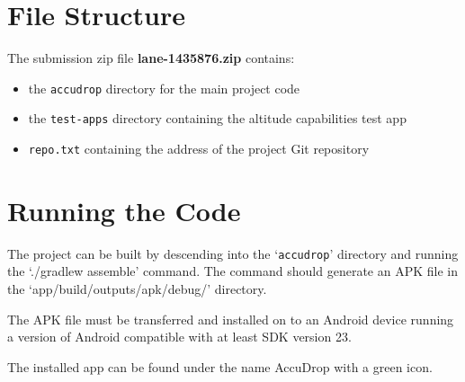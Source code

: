 \appendix
\section{File Structure}\label{sec:file-structure}
The submission zip file \textbf{lane-1435876.zip} contains:
\begin{itemize}
  \item the \texttt{accudrop} directory for the main project code
  \item the \texttt{test-apps} directory containing the altitude capabilities test app
  \item \texttt{repo.txt} containing the address of the project Git repository
\end{itemize}

\section{Running the Code}\label{sec:running-the-code}
The project can be built by descending into the `\texttt{accudrop}' directory and running the `./gradlew assemble' command. The command should generate an APK file in the `app/build/outputs/apk/debug/' directory.

\noindent The APK file must be transferred and installed on to an Android device running a version of Android compatible with at least SDK version 23.

\noindent The installed app can be found under the name AccuDrop with a green icon.
